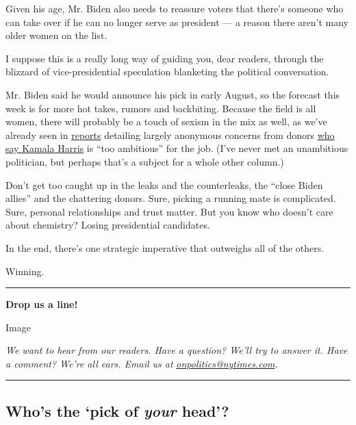 Given his age, Mr. Biden also needs to reassure voters that there's
someone who can take over if he can no longer serve as president --- a
reason there aren't many older women on the list.

I suppose this is a really long way of guiding you, dear readers,
through the blizzard of vice-presidential speculation blanketing the
political conversation.

Mr. Biden said he would announce his pick in early August, so the
forecast this week is for more hot takes, rumors and backbiting. Because
the field is all women, there will probably be a touch of sexism in the
mix as well, as we've already seen in
\href{https://www.politico.com/news/2020/07/27/kamala-harris-biden-vp-381829}{reports}
detailing largely anonymous concerns from donors
\href{https://twitter.com/feliciasonmez/status/1288587415813345282}{who
say Kamala Harris} is ``too ambitious'' for the job. (I've never met an
unambitious politician, but perhaps that's a subject for a whole other
column.)

Don't get too caught up in the leaks and the counterleaks, the ``close
Biden allies'' and the chattering donors. Sure, picking a running mate
is complicated. Sure, personal relationships and trust matter. But you
know who doesn't care about chemistry? Losing presidential candidates.

In the end, there's one strategic imperative that outweighs all of the
others.

Winning.

\begin{center}\rule{0.5\linewidth}{\linethickness}\end{center}

\textbf{Drop us a line!}

Image

\emph{We want to hear from our readers. Have a question? We'll try to
answer it. Have a comment? We're all ears. Email us at}
\href{mailto:onpolitics@nytimes.com}{\emph{onpolitics@nytimes.com}}\emph{.}

\begin{center}\rule{0.5\linewidth}{\linethickness}\end{center}

\hypertarget{whos-the-pick-of-your-head}{%
\subsection{\texorpdfstring{Who's the `pick of \emph{your}
head'?}{Who's the `pick of your head'?}}\label{whos-the-pick-of-your-head}}

